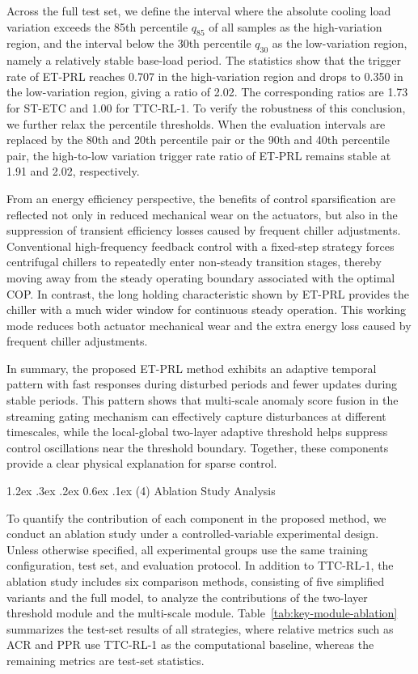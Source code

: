 ﻿\documentclass[preprint,12pt,number]{elsarticle}
\makeatletter
\renewcommand\paragraph{\@startsection{paragraph}{4}{\z@}%
  {1.2ex \@plus .3ex \@minus .2ex}%
  {0.6ex \@plus .1ex}%
  {\normalfont\normalsize}}
\makeatother
\begin{document}
Across the full test set, we define the interval where the absolute cooling load variation exceeds the 85th percentile \(q_{85}\) of all samples as the high-variation region, and the interval below the 30th percentile \(q_{30}\) as the low-variation region, namely a relatively stable base-load period. The statistics show that the trigger rate of ET-PRL reaches 0.707 in the high-variation region and drops to 0.350 in the low-variation region, giving a ratio of 2.02. The corresponding ratios are 1.73 for ST-ETC and 1.00 for TTC-RL-1. To verify the robustness of this conclusion, we further relax the percentile thresholds. When the evaluation intervals are replaced by the 80th and 20th percentile pair or the 90th and 40th percentile pair, the high-to-low variation trigger rate ratio of ET-PRL remains stable at 1.91 and 2.02, respectively.

From an energy efficiency perspective, the benefits of control sparsification are reflected not only in reduced mechanical wear on the actuators, but also in the suppression of transient efficiency losses caused by frequent chiller adjustments. Conventional high-frequency feedback control with a fixed-step strategy forces centrifugal chillers to repeatedly enter non-steady transition stages, thereby moving away from the steady operating boundary associated with the optimal COP. In contrast, the long holding characteristic shown by ET-PRL provides the chiller with a much wider window for continuous steady operation. This working mode reduces both actuator mechanical wear and the extra energy loss caused by frequent chiller adjustments.

In summary, the proposed ET-PRL method exhibits an adaptive temporal pattern with fast responses during disturbed periods and fewer updates during stable periods. This pattern shows that multi-scale anomaly score fusion in the streaming gating mechanism can effectively capture disturbances at different timescales, while the local-global two-layer adaptive threshold helps suppress control oscillations near the threshold boundary. Together, these components provide a clear physical explanation for sparse control.

\paragraph{(4) Ablation Study Analysis}\label{ablation-study-analysis}

To quantify the contribution of each component in the proposed method, we conduct an ablation study under a controlled-variable experimental design. Unless otherwise specified, all experimental groups use the same training configuration, test set, and evaluation protocol. In addition to TTC-RL-1, the ablation study includes six comparison methods, consisting of five simplified variants and the full model, to analyze the contributions of the two-layer threshold module and the multi-scale module. Table~\ref{tab:key-module-ablation} summarizes the test-set results of all strategies, where relative metrics such as ACR and PPR use TTC-RL-1 as the computational baseline, whereas the remaining metrics are test-set statistics.
\end{document}
